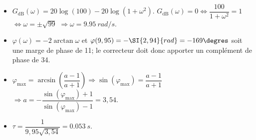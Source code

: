 \ifprof
\begin{corrige}~\\
\begin{itemize}
\item $G_{\text{dB}}(\omega)=20\log \left(100\right)-20\log\left(1+\omega^2\right)$. $G_{\text{dB}}(\omega)=0 \Leftrightarrow \dfrac{100}{1+\omega^2}=1$ $  \Leftrightarrow \omega=\pm\sqrt{99}$ $\Rightarrow \omega=\SI{9,95}{rad/s}$.
\item $\varphi(\omega)=-2\arctan\omega$ et $\varphi(9,95)=-\SI{2,94}{rad}=-169\degres$ soit une marge de phase de 11\degres; le correcteur doit donc apporter un complément de phase de 34\degres. 
\item $\varphi_{\text{max}}=\arcsin\left( \dfrac{a-1}{a+1}\right)\Rightarrow \sin \left(\varphi_{\text{max}}\right)=\dfrac{a-1}{a+1}$ 
$\Rightarrow a=-\dfrac{\sin \left(\varphi_{\text{max}}\right)+1}{ \sin \left(\varphi_{\text{max}}\right) -1}=3,54$.
\item $\tau=\dfrac{1}{9,95\sqrt{3,54}}=\SI{0,053}{s}$.
\end{itemize}
\end{corrige}
\else
\fi


\ifcolle
\else
{}
\fi



